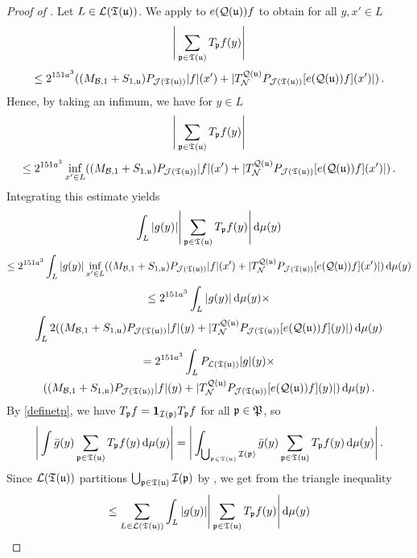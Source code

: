 \begin{proof}[Proof of ]
    Let $L \in \mathcal{L}({\mathfrak T}({\mathfrak u}))$.
    We apply  to $e({\mathcal{Q}}({\mathfrak u})) f$ to obtain for all $y, x' \in L$
    $$
        \Bigg| \sum_{{\mathfrak p} \in {\mathfrak T}({\mathfrak u})} T_{{\mathfrak p}} f(y) \Bigg|
    $$
    $$
        \le 2^{151a^3} ((M_{\mathcal{B},1}+S_{1,{\mathfrak u}})P_{\mathcal{J}({\mathfrak T}({\mathfrak u}))}|f|(x')+|T_{\mathcal{N}}^{{\mathcal{Q}}({\mathfrak u})}P_{\mathcal{J}({\mathfrak T}({\mathfrak u}))}[e({\mathcal{Q}}({\mathfrak u}))f](x')| )\,.
    $$
    Hence, by taking an infimum, we have for $y \in L$
    $$
        \Bigg| \sum_{{\mathfrak p} \in {\mathfrak T}({\mathfrak u})} T_{{\mathfrak p}} f(y) \Bigg|
    $$
    $$
        \le 2^{151a^3} \inf_{x' \in L} ((M_{\mathcal{B},1}+S_{1,{\mathfrak u}})P_{\mathcal{J}({\mathfrak T}({\mathfrak u}))}|f|(x')+|T_{\mathcal{N}}^{{\mathcal{Q}}({\mathfrak u})}P_{\mathcal{J}({\mathfrak T}({\mathfrak u}))}[e({\mathcal{Q}}({\mathfrak u}))f](x')| )\,.
    $$
    Integrating this estimate yields
    $$
        \int_L |g(y)| \Bigg| \sum_{{\mathfrak p} \in {\mathfrak T}({\mathfrak u})} T_{{\mathfrak p}} f(y) \Bigg| \, \mathrm{d}\mu(y)
    $$
    $$
        \le 2^{151a^3} \int_L |g(y)| \inf_{x' \in L}((M_{\mathcal{B},1}+S_{1,{\mathfrak u}})P_{\mathcal{J}({\mathfrak T}({\mathfrak u}))}|f|(x')+|T_{\mathcal{N}}^{{\mathcal{Q}}({\mathfrak u})}P_{\mathcal{J}({\mathfrak T}({\mathfrak u}))}[e({\mathcal{Q}}({\mathfrak u}))f](x')| ) \, \mathrm{d}\mu(y)
    $$
    \begin{multline*}
        \le 2^{151a^3} \int_L |g(y)| \, \mathrm{d}\mu(y)\times\\
         \int_L 2((M_{\mathcal{B},1}+S_{1,{\mathfrak u}})P_{\mathcal{J}({\mathfrak T}({\mathfrak u}))}|f|(y)+|T_{\mathcal{N}}^{{\mathcal{Q}}({\mathfrak u})}P_{\mathcal{J}({\mathfrak T}({\mathfrak u}))}[e({\mathcal{Q}}({\mathfrak u}))f](y)| ) \, \mathrm{d}\mu(y)
    \end{multline*}
    \begin{multline*}
        = 2^{151a^3 } \int_L P_{\mathcal{L}({\mathfrak T}({\mathfrak u}))}|g|(y)\times \\((M_{\mathcal{B},1}+S_{1,{\mathfrak u}})P_{\mathcal{J}({\mathfrak T}({\mathfrak u}))}|f|(y)+|T_{\mathcal{N}}^{{\mathcal{Q}}({\mathfrak u})}P_{\mathcal{J}({\mathfrak T}({\mathfrak u}))}[e({\mathcal{Q}}({\mathfrak u}))f](y)| ) \, \mathrm{d}\mu(y)\,.
    \end{multline*}
    By \eqref{definetp}, we have $T_{{\mathfrak p}} f = \mathbf{1}_{{\mathcal{I}}({\mathfrak p})} T_{{\mathfrak p}} f$ for all ${\mathfrak p} \in {\mathfrak P}$, so
    $$
        \Bigg| \int \bar g(y) \sum_{{\mathfrak p} \in {\mathfrak T}({\mathfrak u})} T_{{\mathfrak p}} f(y) \, \mathrm{d}\mu(y) \Bigg| = \Bigg| \int_{\bigcup_{{\mathfrak p} \in {\mathfrak T}({\mathfrak u})} {\mathcal{I}}({\mathfrak p})} \bar g(y) \sum_{{\mathfrak p} \in {\mathfrak T}({\mathfrak u})} T_{{\mathfrak p}} f(y) \, \mathrm{d}\mu(y) \Bigg|\,.
    $$
    Since $\mathcal{L}({\mathfrak T}({\mathfrak u}))$ partitions $\bigcup_{{\mathfrak p} \in {\mathfrak T}({\mathfrak u})} {\mathcal{I}}({\mathfrak p})$ by ,
    we get from the triangle inequality
    $$
        \le \sum_{L \in \mathcal{L}({\mathfrak T}({\mathfrak u}))} \int_L |g(y)| \Bigg| \sum_{{\mathfrak p} \in {\mathfrak T}({\mathfrak u})} T_{{\mathfrak p}} f(y) \Bigg| \, \mathrm{d}\mu(y)
$$
\end{proof}
